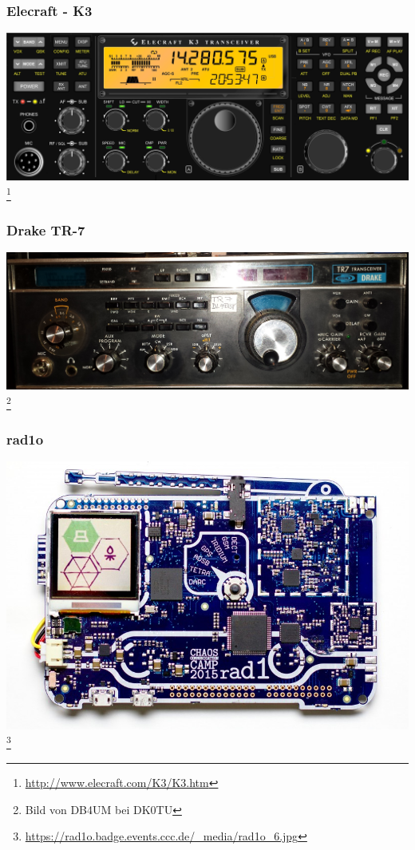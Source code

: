 \begin{frame}
    \frametitle{Elecraft - K3}
        \begin{center}
        \includegraphics[width=1\textwidth,height=.85\textheight,keepaspectratio]{e15/K3_Front.jpg}
        \footnote{\tiny \url{http://www.elecraft.com/K3/K3.htm}}
	\end{center}
\end{frame}

\begin{frame}
    \frametitle{Drake TR-7}
        \begin{center}
        \includegraphics[width=1\textwidth,height=.85\textheight,keepaspectratio]{e15/drake.jpg}
        \footnote{\tiny Bild von DB4UM bei DK0TU}
	\end{center}
\end{frame}

\begin{frame}
  \frametitle{rad1o}
  \begin{center}
    \includegraphics[width=1\textwidth,height=.8\textheight,keepaspectratio]{e15/rad1o.jpg}
    \footnote{\tiny \url{https://rad1o.badge.events.ccc.de/_media/rad1o_6.jpg}}
  \end{center}
\end{frame}

